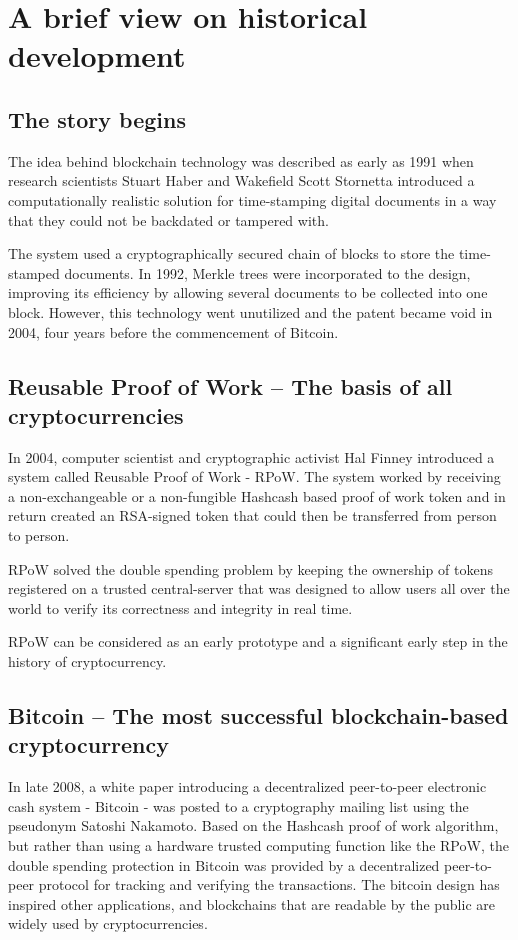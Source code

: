 \documentclass[a4paper]{article}
\begin{document}
	\thispagestyle{empty}
	\newpage
	\tableofcontents
	\newpage
	
	\section{A brief view on historical development}
	\subsection{The story begins}
	The idea behind blockchain technology was described as early as 1991 when research scientists Stuart Haber and Wakefield Scott Stornetta introduced a computationally realistic solution for time-stamping digital documents in a way that they could not be backdated or tampered with.\cite{narayanan2016bitcoin}\cite{haber1990time}
	
	The system used a cryptographically secured chain of blocks to store the time-stamped documents. In 1992, Merkle trees were incorporated to the design, improving its efficiency by allowing several documents to be collected into one block. However, this technology went unutilized and the patent became void in 2004, four years before the commencement of Bitcoin.\cite{narayanan2016bitcoin}\cite{bayer1993improving}
	
	\subsection{Reusable Proof of Work -- The basis of all cryptocurrencies}
	In 2004, computer scientist and cryptographic activist Hal Finney introduced a system called Reusable Proof of Work - RPoW. The system worked by receiving a non-exchangeable or a non-fungible Hashcash based proof of work token and in return created an RSA-signed token that could then be transferred from person to person.
	
	RPoW solved the double spending problem by keeping the ownership of tokens registered on a trusted central-server that was designed to allow users all over the world to verify its correctness and integrity in real time.
	
	RPoW can be considered as an early prototype and a significant early step in the history of cryptocurrency.
	
	\subsection{Bitcoin -- The most successful blockchain-based cryptocurrency}
	In late 2008, a white paper introducing a decentralized peer-to-peer electronic cash system - Bitcoin - was posted to a cryptography mailing list using the pseudonym Satoshi Nakamoto.\cite{theeconomist1} Based on the Hashcash proof of work algorithm, but rather than using a hardware trusted computing function like the RPoW, the double spending protection in Bitcoin was provided by a decentralized peer-to-peer protocol for tracking and verifying the transactions. The bitcoin design has inspired other applications, and blockchains that are readable by the public are widely used by cryptocurrencies.\cite{theeconomist1}\cite{popper2016venture}
	
\end{document}
